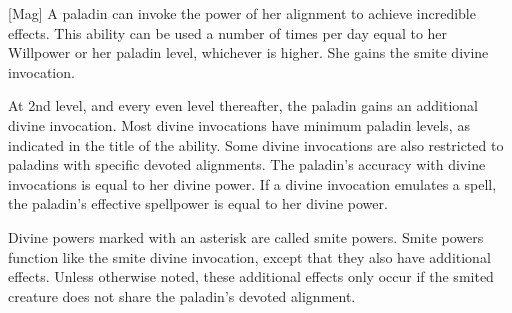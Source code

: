         [Mag]
        A paladin can invoke the power of her alignment to achieve incredible effects.
        This ability can be used a number of times per day equal to her Willpower or her paladin level, whichever is higher.
        She gains the smite divine invocation.

        At 2nd level, and every even level thereafter, the paladin gains an additional divine invocation.
        Most divine invocations have minimum paladin levels, as indicated in the title of the ability.
        Some divine invocations are also restricted to paladins with specific devoted alignments.
        The paladin's accuracy with divine invocations is equal to her divine power.
        If a divine invocation emulates a spell, the paladin's effective spellpower is equal to her divine power.

        Divine powers marked with an asterisk are called smite powers.
        Smite powers function like the smite divine invocation, except that they also have additional effects.
        Unless otherwise noted, these additional effects only occur if the smited creature does not share the paladin's devoted alignment.


